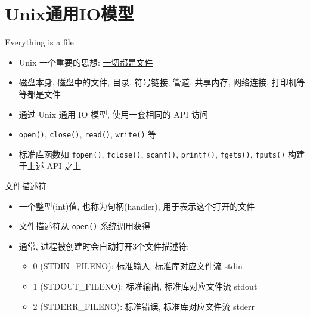 \section{Unix通用IO模型}\label{sec:unix_io_model}

\begin{frame}[fragile]{Everything is a file}
    \begin{itemize}[<+- | alert@+>]
        \item Unix 一个重要的思想: \href{https://en.wikipedia.org/wiki/Everything_is_a_file}{一切都是文件}
        \item 磁盘本身, 磁盘中的文件, 目录, 符号链接, 管道, 共享内存, 网络连接, 打印机等等都是文件
        \item 通过 Unix 通用 IO 模型, 使用一套相同的 API 访问
        \item \texttt{open()}, \texttt{close()}, \texttt{read()}, \texttt{write()} 等
        \item 标准库函数如 \texttt{fopen()}, \texttt{fclose()}, \texttt{scanf()}, \texttt{printf()}, \texttt{fgets()}, \texttt{fputs()} 构建于上述 API 之上
    \end{itemize}
\end{frame}

\begin{frame}[fragile]{文件描述符}
    \begin{itemize}[<+- | alert@+>]
        \item 一个整型(int)值, 也称为句柄(handler), 用于表示这个打开的文件
        \item 文件描述符从 \texttt{open()} 系统调用获得
        \item 通常, 进程被创建时会自动打开3个文件描述符:
        \begin{itemize}
            \item 0 (STDIN\_FILENO): 标准输入, 标准库对应文件流 stdin
            \item 1 (STDOUT\_FILENO): 标准输出, 标准库对应文件流 stdout
            \item 2 (STDERR\_FILENO): 标准错误, 标准库对应文件流 stderr
        \end{itemize}
    \end{itemize}
\end{frame}

